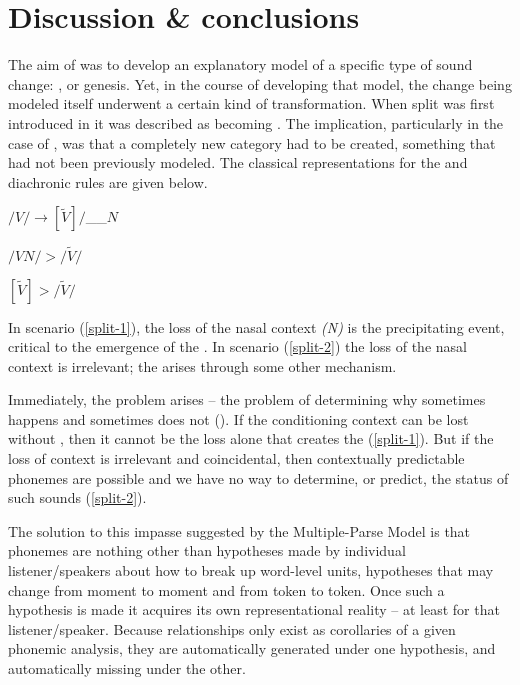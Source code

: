 \chapter{Discussion \& conclusions}\label{ch:Summary}

The aim of  was to develop an explanatory
model of a specific type of sound change: , or 
genesis. Yet, in the course of developing that model, the change being
modeled itself underwent a certain kind of transformation. When 
split was first introduced in  it was
described as  becoming . The implication, particularly
in the case of , was that a completely new 
category had to be created, something that had not been previously
modeled. The classical representations for the  and diachronic
rules are given below.
\begin{covexample}
\label{allophonic rule}$/V/\rightarrow[\tilde{V}]/$\_\_$N$
\end{covexample}
\begin{covsubexamples}
\item \label{split-1}$/VN/>/\tilde{V}/$
\item \label{split-2}$[\tilde{V}]>/\tilde{V}/$
\end{covsubexamples}
In scenario (\ref{split-1}), the loss of the nasal context \emph{(N)}
is the precipitating event, critical to the emergence of the .
In scenario (\ref{split-2}) the loss of the nasal context is irrelevant;
the  arises through some other mechanism.

Immediately, the  problem arises – the problem of determining
why  sometimes happens and sometimes does not (\citealt{Labov1968}).
If the conditioning context can be lost without , then
it cannot be the loss alone that creates the  (\ref{split-1}).
But if the loss of context is irrelevant and coincidental, then contextually
predictable phonemes are possible and we have no way to determine, or predict, the status of such sounds (\ref{split-2}).

The solution to this impasse suggested by the Multiple-Parse
Model is that phonemes are nothing other than hypotheses made by individual
listener/speakers about how to break up word-level units, hypotheses
that may change from moment to moment and from token to token. Once
such a hypothesis is made it acquires its own representational reality
– at least for that listener/speaker. Because  relationships only
exist as corollaries of a given phonemic analysis, they are automatically
generated under one hypothesis, and automatically missing under the
other. 

